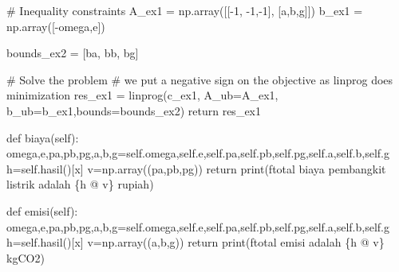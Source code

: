 \documentclass[
  a4paper,
  DIV=11,
  numbers=noendperiod]{scrartcl}
\newenvironment{Shaded}{\begin{snugshade}}{\end{snugshade}}
\newcommand{\BuiltInTok}[1]{\textcolor[rgb]{0.00,0.23,0.31}{#1}}
\newcommand{\CommentTok}[1]{\textcolor[rgb]{0.37,0.37,0.37}{#1}}
\newcommand{\ControlFlowTok}[1]{\textcolor[rgb]{0.00,0.23,0.31}{#1}}
\newcommand{\DecValTok}[1]{\textcolor[rgb]{0.68,0.00,0.00}{#1}}
\newcommand{\KeywordTok}[1]{\textcolor[rgb]{0.00,0.23,0.31}{#1}}
\newcommand{\NormalTok}[1]{\textcolor[rgb]{0.00,0.23,0.31}{#1}}
\newcommand{\OperatorTok}[1]{\textcolor[rgb]{0.37,0.37,0.37}{#1}}
\newcommand{\SpecialCharTok}[1]{\textcolor[rgb]{0.37,0.37,0.37}{#1}}
\newcommand{\SpecialStringTok}[1]{\textcolor[rgb]{0.13,0.47,0.30}{#1}}
\newcommand{\StringTok}[1]{\textcolor[rgb]{0.13,0.47,0.30}{#1}}
\newcommand{\VariableTok}[1]{\textcolor[rgb]{0.07,0.07,0.07}{#1}}
\begin{document}
\begin{Shaded}
\begin{Highlighting}[]
    \CommentTok{\# Inequality constraints}
\NormalTok{    A\_ex1 }\OperatorTok{=}\NormalTok{ np.array([[}\OperatorTok{{-}}\DecValTok{1}\NormalTok{, }\OperatorTok{{-}}\DecValTok{1}\NormalTok{,}\OperatorTok{{-}}\DecValTok{1}\NormalTok{],}
\NormalTok{                  [a,b,g]])}
\NormalTok{    b\_ex1 }\OperatorTok{=}\NormalTok{ np.array([}\OperatorTok{{-}}\NormalTok{omega,e])}

\NormalTok{    bounds\_ex2 }\OperatorTok{=}\NormalTok{ [ba,}
\NormalTok{                  bb,}
\NormalTok{                  bg]}

    \CommentTok{\# Solve the problem}
    \CommentTok{\# we put a negative sign on the objective as linprog does minimization}
\NormalTok{    res\_ex1 }\OperatorTok{=}\NormalTok{ linprog(c\_ex1, A\_ub}\OperatorTok{=}\NormalTok{A\_ex1, b\_ub}\OperatorTok{=}\NormalTok{b\_ex1,bounds}\OperatorTok{=}\NormalTok{bounds\_ex2)}
    \ControlFlowTok{return}\NormalTok{ res\_ex1}
  
  \KeywordTok{def}\NormalTok{ biaya(}\VariableTok{self}\NormalTok{):}
\NormalTok{    omega,e,pa,pb,pg,a,b,g}\OperatorTok{=}\VariableTok{self}\NormalTok{.omega,}\VariableTok{self}\NormalTok{.e,}\VariableTok{self}\NormalTok{.pa,}\VariableTok{self}\NormalTok{.pb,}\VariableTok{self}\NormalTok{.pg,}\VariableTok{self}\NormalTok{.a,}\VariableTok{self}\NormalTok{.b,}\VariableTok{self}\NormalTok{.g}
\NormalTok{    h}\OperatorTok{=}\VariableTok{self}\NormalTok{.hasil()[}\StringTok{\textquotesingle{}x\textquotesingle{}}\NormalTok{]}
\NormalTok{    v}\OperatorTok{=}\NormalTok{np.array((pa,pb,pg))}
    \ControlFlowTok{return} \BuiltInTok{print}\NormalTok{(}\SpecialStringTok{f\textquotesingle{}total biaya pembangkit listrik adalah }\SpecialCharTok{\{}\NormalTok{h }\OperatorTok{@}\NormalTok{ v}\SpecialCharTok{\}}\SpecialStringTok{ rupiah\textquotesingle{}}\NormalTok{)}
  
  \KeywordTok{def}\NormalTok{ emisi(}\VariableTok{self}\NormalTok{):}
\NormalTok{    omega,e,pa,pb,pg,a,b,g}\OperatorTok{=}\VariableTok{self}\NormalTok{.omega,}\VariableTok{self}\NormalTok{.e,}\VariableTok{self}\NormalTok{.pa,}\VariableTok{self}\NormalTok{.pb,}\VariableTok{self}\NormalTok{.pg,}\VariableTok{self}\NormalTok{.a,}\VariableTok{self}\NormalTok{.b,}\VariableTok{self}\NormalTok{.g}
\NormalTok{    h}\OperatorTok{=}\VariableTok{self}\NormalTok{.hasil()[}\StringTok{\textquotesingle{}x\textquotesingle{}}\NormalTok{]}
\NormalTok{    v}\OperatorTok{=}\NormalTok{np.array((a,b,g))}
    \ControlFlowTok{return} \BuiltInTok{print}\NormalTok{(}\SpecialStringTok{f\textquotesingle{}total emisi adalah }\SpecialCharTok{\{}\NormalTok{h }\OperatorTok{@}\NormalTok{ v}\SpecialCharTok{\}}\SpecialStringTok{ kgCO2\textquotesingle{}}\NormalTok{)}
  

\end{Highlighting}
\end{Shaded}
\end{document}
